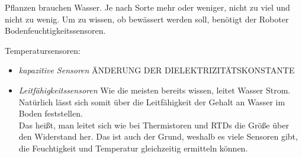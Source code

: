 		Pflanzen brauchen Wasser. Je nach Sorte mehr oder weniger, nicht zu viel und nicht zu wenig. Um zu wissen, ob bewässert werden soll, benötigt der Roboter Bodenfeuchtigkeitssensoren.
		
		\begin{description}
			\item {Temperatursensoren:}
			\begin{itemize}
				\item {\textit{kapazitive Sensoren}}
				ÄNDERUNG DER DIELEKTRIZITÄTSKONSTANTE
				
				\cite{induuxwiki2022}
				\item {\textit{Leitfähigkeitssensoren}}
				Wie die meisten bereits wissen, leitet Wasser Strom. Natürlich lässt sich somit über die Leitfähigkeit der Gehalt an Wasser im Boden feststellen.\\
				Das heißt, man leitet sich wie bei Thermistoren und RTDs die Größe über den Widerstand her. Das ist auch der Grund, weshalb es viele Sensoren gibt, die Feuchtigkeit und Temperatur gleichzeitig ermitteln können.
			\end{itemize}
		\end{description}
		